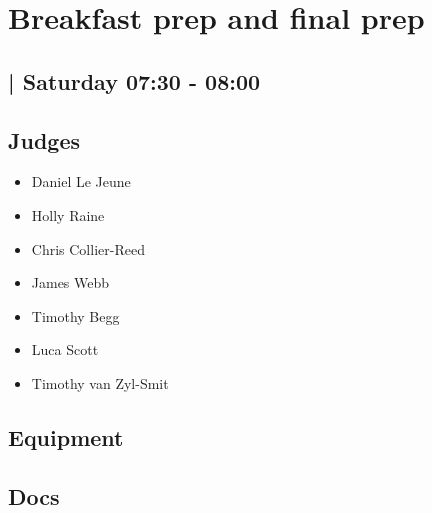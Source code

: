 \documentclass[10pt]{article}
\begin{document}
		\begin{minipage}{\linewidth}
		\setcounter{section}{11}
	\section{Breakfast prep and final prep }
	\subsection*{ | Saturday 07:30 - 08:00}

	

	\begin{multicols}{2}
	\subsection*{\faUsers \: Judges}
	\begin{itemize}
			\item Daniel Le Jeune
			\item Holly Raine
			\item Chris Collier-Reed
			\item James Webb
			\item Timothy Begg
			\item Luca Scott
			\item Timothy van Zyl-Smit
		\end{itemize}
	\columnbreak
	\subsection*{\faWrench \: Equipment}
	        \vfill\null
        \subsection*{\faFile \: Docs}
     	\end{multicols}


	\vspace{1cm}
	\end{minipage}
\end{document}
